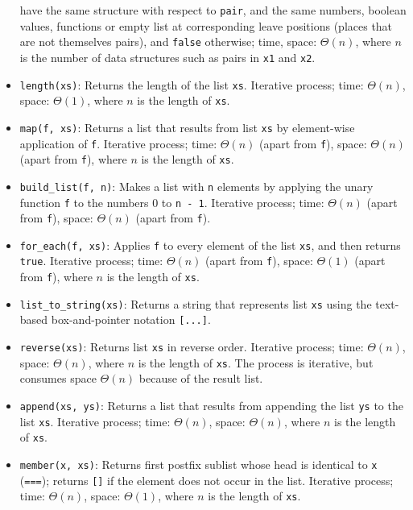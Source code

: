 \begin{itemize}
  have the same structure with respect to \lstinline{pair},
  and the same numbers, boolean values, functions or empty list
  at corresponding leave positions (places that are not themselves pairs),
  and \lstinline{false} otherwise; time, space:
  $\Theta(n)$, where $n$ is the number of data structures such as pairs
  in \lstinline{x1} and \lstinline{x2}.
\item \lstinline{length(xs)}: Returns the length of the list
  \lstinline{xs}. 
Iterative process; time: $\Theta(n)$, space: $\Theta(1)$, where $n$ is the length of \lstinline{xs}.
\item \lstinline{map(f, xs)}: Returns a list that results from list
  \lstinline{xs} by element-wise application of \lstinline{f}. 
Iterative process; time: $\Theta(n)$ (apart from \lstinline{f}), space: $\Theta(n)$ (apart from \lstinline{f}), where $n$ is the length of \lstinline{xs}.
\item \lstinline{build_list(f, n)}: Makes a list with \lstinline{n}
elements by applying the unary function \lstinline{f} to the numbers 0 to \lstinline{n - 1}.
Iterative process; time: $\Theta(n)$ (apart from \lstinline{f}), space: $\Theta(n)$ (apart from \lstinline{f}).
\item \lstinline{for_each(f, xs)}: Applies \lstinline{f} to every
  element of the list \lstinline{xs}, and then returns
  \lstinline{true}. 
Iterative process; time: $\Theta(n)$ (apart from \lstinline{f}), space: $\Theta(1)$ (apart from \lstinline{f}), where $n$ is the length of \lstinline{xs}.
\item \lstinline{list_to_string(xs)}: Returns a string that represents
list \lstinline{xs} using the text-based box-and-pointer notation \lstinline{[...]}.
\item \lstinline{reverse(xs)}: Returns list \lstinline{xs} in reverse
  order. Iterative process; time: $\Theta(n)$, space: $\Theta(n)$, where $n$ is the length of \lstinline{xs}.
The process is iterative, but consumes space $\Theta(n)$ because of the result list.
\item \lstinline{append(xs, ys)}: Returns a list that results from 
appending the list \lstinline{ys} to the list \lstinline{xs}.
Iterative process; time: $\Theta(n)$, space: $\Theta(n)$, where $n$ is the length of \lstinline{xs}.
\item \lstinline{member(x, xs)}: Returns first postfix sublist
whose head is identical to
\lstinline{x} (\lstinline{===}); returns \lstinline{[]} if the
element does not occur in the list.
Iterative process; time: $\Theta(n)$, space: $\Theta(1)$, where $n$ is the length of \lstinline{xs}.

\end{itemize}
